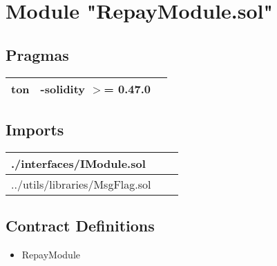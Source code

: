 
\section{Module "RepayModule.sol"}


\subsection{Pragmas}


\noindent\begin{tabular}{|l|l|p{5cm}|}\hline
ton & -solidity $>$= 0.47.0 &\\\hline
\end{tabular}


\subsection{Imports}


\noindent\begin{tabular}{|l|l|p{5cm}|}\hline
./interfaces/IModule.sol &\\\hline
../utils/libraries/MsgFlag.sol &\\\hline
\end{tabular}


\subsection{Contract Definitions}

\begin{itemize}
\item RepayModule
\end{itemize}

